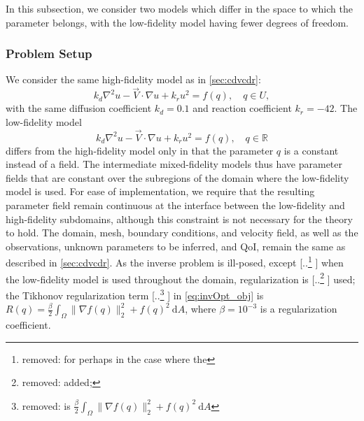 \documentclass[review]{siamart0516}
\newcommand{\R}{{\mathbb{R}}}
\providecommand{\DIFaddtex}[1]{{\protect\color{blue} \sf #1}} %
\providecommand{\DIFdeltex}[1]{{\protect\color{red} [..\footnote{removed: #1} ]}} %
\providecommand{\DIFaddbegin}{} %
\providecommand{\DIFaddend}{} %
\providecommand{\DIFdelbegin}{} %
\providecommand{\DIFdelend}{} %
\providecommand{\DIFadd}[1]{\texorpdfstring{\DIFaddtex{#1}}{#1}} %
\providecommand{\DIFdel}[1]{\texorpdfstring{\DIFdeltex{#1}}{}} %
\newcommand{\DIFscaledelfig}{0.5}
\newlength{\DIFdelgraphicswidth} %
\newlength{\DIFdelgraphicsheight} %
\newcommand{\DIFaddincludegraphics}[2][]{{\color{blue}\fbox{\DIFOincludegraphics[#1]{#2}}}} %
\newcommand{\DIFdelincludegraphics}[2][]{%
\sbox{\DIFdelgraphicsbox}{\DIFOincludegraphics[#1]{#2}}%
\settoboxwidth{\DIFdelgraphicswidth}{\DIFdelgraphicsbox} %
\settoboxtotalheight{\DIFdelgraphicsheight}{\DIFdelgraphicsbox} %
\scalebox{\DIFscaledelfig}{%
\parbox[b]{\DIFdelgraphicswidth}{\usebox{\DIFdelgraphicsbox}\\[-\baselineskip] \rule{\DIFdelgraphicswidth}{0em}}\llap{\resizebox{\DIFdelgraphicswidth}{\DIFdelgraphicsheight}{%
\setlength{\unitlength}{\DIFdelgraphicswidth}%
\begin{picture}(1,1)%
\thicklines\linethickness{2pt} %
{\color[rgb]{1,0,0}\put(0,0){\framebox(1,1){}}}%
{\color[rgb]{1,0,0}\put(0,0){\line( 1,1){1}}}%
{\color[rgb]{1,0,0}\put(0,1){\line(1,-1){1}}}%
\end{picture}%
}\hspace*{3pt}}} %
} %
\DeclareRobustCommand{\DIFaddbegin}{\DIFOaddbegin \let\includegraphics\DIFaddincludegraphics} %
\DeclareRobustCommand{\DIFaddend}{\DIFOaddend \let\includegraphics\DIFOincludegraphics} %
\DeclareRobustCommand{\DIFdelbegin}{\DIFOdelbegin \let\includegraphics\DIFdelincludegraphics} %
\DeclareRobustCommand{\DIFdelend}{\DIFOaddend \let\includegraphics\DIFOincludegraphics} %
\begin{document}
In this subsection, we consider two models which differ in the space to which the parameter belongs, with the low-fidelity model having fewer degrees of freedom. 

\subsubsection{Problem Setup}

We consider the same high-fidelity model as in \cref{sec:cdvcdr}:
\begin{equation}
k_d\nabla^2 u - \vec{V}\cdot\nabla u + k_ru^2= f(q),\quad q\in U,
\end{equation}
with the same diffusion coefficient $k_d = 0.1$  and reaction coefficient $k_r = -42$. The low-fidelity model
\begin{equation}
k_d\nabla^2 u - \vec{V}\cdot\nabla u + k_ru^2= f(q),\quad q\in\R
\end{equation}
differs from the high-fidelity model only in that the parameter $q$ is a constant instead of a field. The intermediate mixed-fidelity models thus have parameter fields that are constant over the subregions of the domain where the low-fidelity model is used. For ease of implementation, we require that the resulting parameter field remain continuous at the interface between the low-fidelity and high-fidelity subdomains, although this constraint is not necessary for the theory to hold. The domain, mesh, boundary conditions, and velocity field, as well as the observations, unknown parameters to be inferred, and QoI, remain the same as described in \cref{sec:cdvcdr}. As the inverse problem is ill-posed, except \DIFdelbegin \DIFdel{for perhaps %
in the case where the }\DIFdelend \DIFaddbegin \DIFadd{when the }\DIFaddend low-fidelity model is used throughout the domain, regularization is \DIFdelbegin \DIFdel{added; %
 }\DIFdelend \DIFaddbegin \DIFadd{used; }\DIFaddend the Tikhonov regularization term \DIFdelbegin \DIFdel{is $\frac{\beta}{2}\int_\Omega \|\nabla f(q)\|_2^2+f(q)^2\:\textrm{d}A$}\DIFdelend \DIFaddbegin \DIFadd{in }\cref{eq:invOpt_obj} \DIFadd{is $R(q)=\frac{\beta}{2}\int_\Omega \|\nabla f(q)\|_2^2+f(q)^2\:\textrm{d}A$}\DIFaddend , where $\beta=10^{-3}$ is a regularization coefficient. 

\DIFdelbegin %
\end{document}
